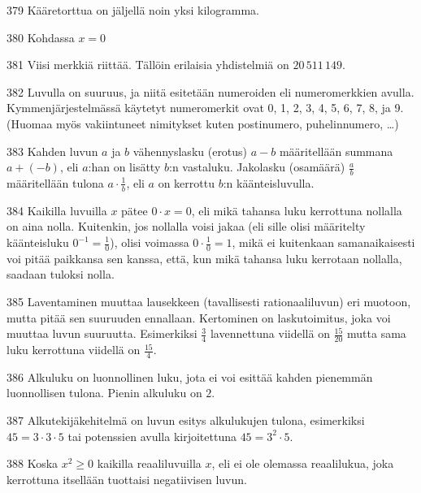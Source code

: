 \begin{Vastaus}{379}
Kääretorttua on jäljellä noin yksi kilogramma.
\end{Vastaus}
\begin{Vastaus}{380}
Kohdassa $x=0$
\end{Vastaus}
\begin{Vastaus}{381}
Viisi merkkiä riittää. Tällöin erilaisia yhdistelmiä on $20\,511\,149$.
\end{Vastaus}
\begin{Vastaus}{382}
Luvulla on suuruus, ja niitä esitetään numeroiden eli numeromerkkien avulla. Kymmenjärjestelmässä käytetyt numeromerkit ovat 0, 1, 2, 3, 4, 5, 6, 7, 8, ja 9. (Huomaa myös vakiintuneet nimitykset kuten postinumero, puhelinnumero, \ldots)
\end{Vastaus}
\begin{Vastaus}{383}
Kahden luvun $a$ ja $b$ vähennyslasku (erotus) $a-b$ määritellään summana $a+(-b)$, eli $a$:han on lisätty $b$:n vastaluku. Jakolasku (osamäärä) $\frac{a}{b}$ määritellään tulona $a\cdot \frac1b$, eli $a$ on kerrottu $b$:n käänteisluvulla.
\end{Vastaus}
\begin{Vastaus}{384}
Kaikilla luvuilla $x$ pätee $0 \cdot x = 0$, eli mikä tahansa luku kerrottuna nollalla on aina nolla. Kuitenkin, jos nollalla voisi jakaa (eli sille olisi määritelty käänteisluku $0^{-1}=\frac10$), olisi voimassa $0 \cdot\frac10 = 1$, mikä ei kuitenkaan samanaikaisesti voi pitää paikkansa sen kanssa, että, kun mikä tahansa luku kerrotaan nollalla, saadaan tuloksi nolla.
\end{Vastaus}
\begin{Vastaus}{385}
Laventaminen muuttaa lausekkeen (tavallisesti rationaaliluvun) eri muotoon, mutta pitää sen suuruuden ennallaan. Kertominen on laskutoimitus, joka voi muuttaa luvun suuruutta. Esimerkiksi $\frac34$ lavennettuna viidellä on $\frac{15}{20}$ mutta sama luku kerrottuna viidellä on $\frac{15}{4}$.
\end{Vastaus}
\begin{Vastaus}{386}
Alkuluku on luonnollinen luku, jota ei voi esittää kahden pienemmän luonnollisen tulona. Pienin alkuluku on $2$. %
\end{Vastaus}
\begin{Vastaus}{387}
Alkutekijäkehitelmä on luvun esitys alkulukujen tulona, esimerkiksi $45=3\cdot 3 \cdot 5$ tai potenssien avulla kirjoitettuna $45=3^2\cdot 5$.
\end{Vastaus}
\begin{Vastaus}{388}
Koska $x^2 \geq 0$ kaikilla reaaliluvuilla $x$, eli ei ole olemassa reaalilukua, joka kerrottuna itsellään tuottaisi negatiivisen luvun.
\end{Vastaus}
